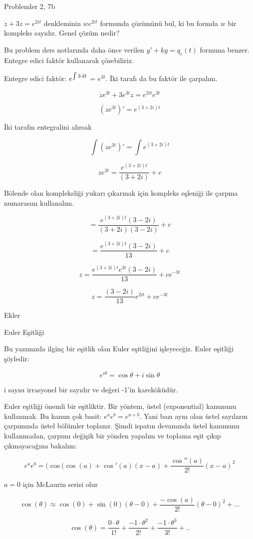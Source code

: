 \documentclass[12pt,fleqn]{article}\usepackage{../../common}
\begin{document}
Problemler 2, 7b

$\dot{z} + 3z = e^{2it}$ denkleminin $we^{2it}$ formunda çözümünü bul, ki
bu formda $w$ bir kompleks sayıdır. Genel çözüm nedir? 

Bu problem ders notlarında daha önce verilen $y' + ky = q_e(t)$ formuna
benzer. Entegre edici faktör kullanarak çözebiliriz. 

Entegre edici faktör: $e^{\int 3 \,\mathrm{d} t}$ = $e^{3t}$. İki tarafı da bu faktör
ile çarpalım. 

$$ \dot{z}e^{3t} + 3e^{3t}z = e^{2it}e^{3t} $$

$$ (ze^{3t})' = e^{(3+2i)t} $$

İki tarafın entegralini alırsak

$$ \int (ze^{3t})' = \int e^{(3+2i) t} $$

$$ ze^{3t} =  \frac {e^{(3+2i)t}}{(3+2i)} + c$$

Bölende olan kompleksliği yukarı çıkarmak için kompleks eşleniği ile
çarpma numarasını kullanalım. 

$$ =  \frac {e^{(3+2i)t}(3-2i)}{(3+2i)(3-2i)} + c$$

$$ =  \frac {e^{(3+2i)t}(3-2i)}{13} + c$$

$$ z =  \frac {e^{(3+2i)t}e^{3t}(3-2i)}{13} + c e^{-3t}$$

$$ z = \frac {(3-2i)}{13} e^{2it} + c e^{-3t}$$

Ekler

Euler Eşitliği

Bu yazımızda ilginç bir eşitlik olan Euler eşitliğini işleyeceğiz. Euler
eşitliği şöyledir:

$$ e^{i \theta} = \cos \theta + i\sin \theta $$

i sayısı irrasyonel bir sayıdır ve değeri -1'in kareköküdür. 

Euler eşitliği önemli bir eşitliktir. Bir yöntem, üstel (exponential)
kanununu kullanmak. Bu kanun çok basit: $e^{a}e^{b} = e^{a+ b}$. Yani bazı
aynı olan üstel sayıların çarpımında üstel bölümler toplanır. Şimdi ispatın
devamında üstel kanununu kullanmadan, çarpımı değişik bir yönden yapalım ve
toplama eşit çıkıp çıkmayacağına bakalım:

$$ e^{a}e^{b} = ( \cos(\cos(a) + \cos'(a)(x-a) + \frac{\cos''(a)}{2!}(x-a)^2 $$

$a=0$ için McLaurin serisi olur

$$ \cos(\theta) \approx \cos(0) + \sin(0)(\theta - 0) +
\frac{-\cos(a)}{2!}(\theta - 0)^2 + ... $$

$$ \cos(\theta) = \frac{0 \cdot \theta}{1!} + \frac{-1 \cdot \theta^2}{2!} +
\frac{-1 \cdot \theta^3}{3!} + ..
 $$
\end{document}
